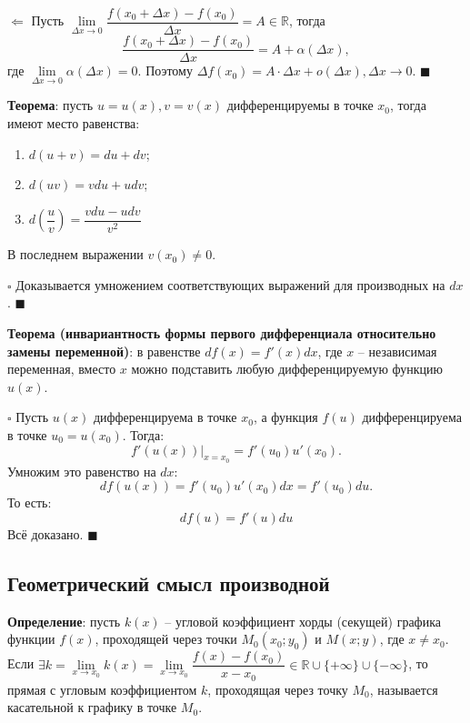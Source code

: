 \documentclass[12pt, a4paper, reqno]{article}
\begin{document}
    $\boxed{\Leftarrow}$ Пусть $\lim\limits_{\Delta x\to 0} \dfrac{f(x_0 + \Delta x) -
    f(x_0)}{\Delta x} = A\in\mathbb{R}$, тогда
    \begin{equation*}
        \dfrac{f(x_0 + \Delta x) - f(x_0)}{\Delta x} = A + \alpha(\Delta x),
    \end{equation*}
    где $\lim\limits_{\Delta x\to 0} \alpha(\Delta x) = 0$. Поэтому $\Delta f(x_0) = A\cdot\Delta x
    + o(\Delta x), \Delta x\to 0$. $\blacksquare$

    \textbf{Теорема}: пусть $u = u(x), v = v(x)$ дифференцируемы в точке $x_0$, тогда имеют место
    равенства:
    \begin{enumerate}
        \item $d(u + v) = du + dv$;
        \item $d(uv) = vdu + udv$;
        \item $d\left(\dfrac{u}{v}\right) = \dfrac{vdu - udv}{v^2}$
    \end{enumerate}
    В последнем выражении $v(x_0)\neq 0$.

    $\square$ Доказывается умножением соответствующих выражений для производных на $dx$.
    $\blacksquare$

    \textbf{Теорема (инвариантность формы первого дифференциала относительно замены переменной)}: в
    равенстве $df(x) = f'(x)dx$, где $x$ -- независимая переменная, вместо $x$ можно подставить любую
    дифференцируемую функцию $u(x)$.

    $\square$ Пусть $u(x)$ дифференцируема в точке $x_0$, а функция $f(u)$ дифференцируема в точке
    $u_0 = u(x_0)$. Тогда:
    \begin{equation*}
        f'(u(x))|_{x = x_0} = f'(u_0)u'(x_0).
    \end{equation*}
    Умножим это равенство на $dx$:
    \begin{equation*}
        df(u(x)) = f'(u_0)u'(x_0)dx = f'(u_0)du.
    \end{equation*}
    То есть:
    \begin{equation*}
        df(u) = f'(u)du
    \end{equation*}
    Всё доказано. $\blacksquare$

    \subsection{Геометрический смысл производной}
    \textbf{Определение}: пусть $k(x)$ -- угловой коэффициент хорды (секущей) графика функции $f(x)$,
    проходящей через точки $M_0(x_0; y_0)$ и $M(x; y)$, где $x\neq x_0$. Если $\exists
    k = \lim\limits_{x\to x_0} k(x) = \lim\limits_{x\to x_0} \dfrac{f(x) - f(x_0)}{x - x_0}\in
    \mathbb{R}\cup\{+\infty\}\cup\{-\infty\}$, то прямая с угловым коэффициентом $k$, проходящая
    через точку $M_0$, называется касательной к графику в точке $M_0$.
\end{document}
